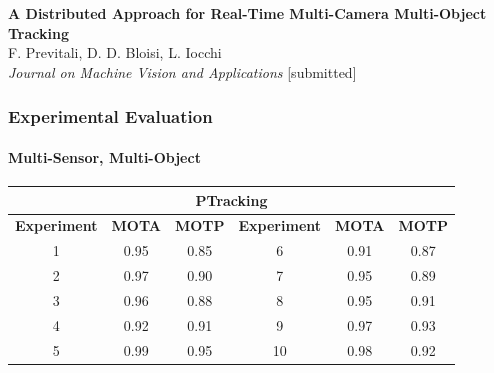 \begin{frame}
	\tiny
	
	\textbf{A Distributed Approach for Real-Time Multi-Camera Multi-Object Tracking} \\
	F. Previtali, D. D. Bloisi, L. Iocchi \\
	\emph{Journal on Machine Vision and Applications} [submitted] \\
\end{frame}

\begin{frame}
	\frametitle{Experimental Evaluation}
	\framesubtitle{Multi-Sensor, Multi-Object}
	
	\begin{center}
	\end{center}
	
	\scriptsize
	
	\vspace{-0.254cm}
	
	\begin{table}[!t]
		\centering
		\renewcommand{\arraystretch}{1.1}
		\setlength{\tabcolsep}{0.09cm}
		\begin{tabular}{c c c | c c c}
			\cline{1-6}
			\multicolumn{6}{c}{\textbf{PTracking}} \\ \hline
			\textbf{Experiment} & \textbf{MOTA} & \textbf{MOTP} & \textbf{Experiment} & \textbf{MOTA} & \textbf{MOTP} \\
			\hline
			1 & 0.95 & 0.85 & 6 & 0.91 & 0.87 \\
			2 & 0.97 & 0.90 & 7 & 0.95 & 0.89 \\
			3 & 0.96 & 0.88 & 8 & 0.95 & 0.91 \\
			4 & 0.92 & 0.91 & 9 & 0.97 & 0.93 \\
			5 & 0.99 & 0.95 & 10 & 0.98 & 0.92 \\
			\hline
		\end{tabular}
	\end{table}
	

\end{frame}
